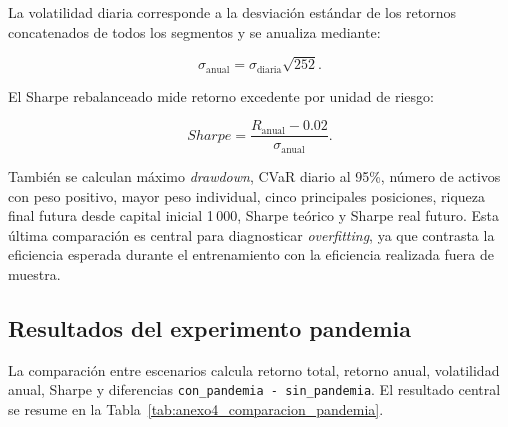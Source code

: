 La volatilidad diaria corresponde a la desviaci\'on est\'andar de los retornos
concatenados de todos los segmentos y se anualiza mediante:

\begin{equation}
\sigma_{\text{anual}} = \sigma_{\text{diaria}}\sqrt{252}.
\end{equation}

El Sharpe rebalanceado mide retorno excedente por unidad de riesgo:

\begin{equation}
Sharpe = \frac{R_{\text{anual}} - 0.02}{\sigma_{\text{anual}}}.
\end{equation}

Tambi\'en se calculan m\'aximo \textit{drawdown}, CVaR diario al 95\%, n\'umero
de activos con peso positivo, mayor peso individual, cinco principales
posiciones, riqueza final futura desde capital inicial 1\,000, Sharpe te\'orico
y Sharpe real futuro. Esta \'ultima comparaci\'on es central para diagnosticar
\textit{overfitting}, ya que contrasta la eficiencia esperada durante el
entrenamiento con la eficiencia realizada fuera de muestra.

\subsection*{Resultados del experimento pandemia}

La comparaci\'on entre escenarios calcula retorno total, retorno anual,
volatilidad anual, Sharpe y diferencias
\texttt{con\_pandemia - sin\_pandemia}. El resultado central se resume en la
Tabla~\ref{tab:anexo4_comparacion_pandemia}.

